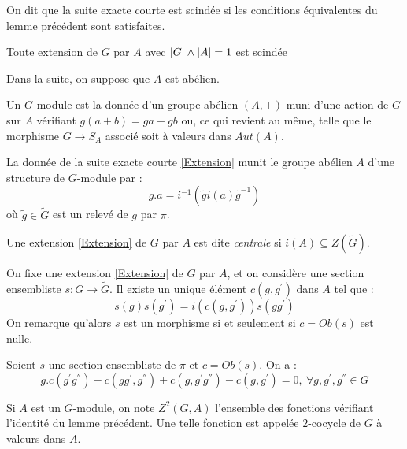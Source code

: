 \documentclass{cours}
\begin{document}
\begin{definition}
    On dit que la suite exacte courte est scindée si les conditions équivalentes du lemme précédent sont satisfaites. 
\end{definition}

\begin{theorem}
    Toute extension de $G$ par $A$ avec $\left|G\right| \wedge \left|A\right| = 1$ est scindée
\end{theorem}

Dans la suite, on suppose que $A$ est abélien.

\begin{definition}
    Un $G$-module est la donnée d'un groupe abélien $(A, +)$ muni d'une action de $G$ sur $A$ vérifiant $g(a + b) = ga + gb$ ou, ce qui revient au même, telle que le morphisme $G \rightarrow S_{A}$ associé soit à valeurs dans $Aut(A)$.
\end{definition}

\begin{proposition}
    La donnée de la suite exacte courte \ref{Extension} munit le groupe abélien $A$ d'une structure de $G$-module par : 
    \[
        g.a = i^{-1}\left(\tilde{g}i(a)\tilde{g}^{-1}\right)    
    \]
    où $\tilde{g} \in \tilde{G}$ est un relevé de $g$ par $\pi$.
\end{proposition}

\begin{example}
    Une extension \ref{Extension} de $G$ par $A$ est dite \emph{centrale} si $i(A) \subseteq Z(\tilde{G})$.  
\end{example}

On fixe une extension \ref{Extension} de $G$ par $A$, et on considère une section ensembliste $s : G \rightarrow \tilde{G}$. Il existe un unique élément $c(g, g^{'})$ dans $A$ tel que : 
\[
    s(g)s(g^{'}) = i(c(g, g^{'}))s(gg^{'})
\]
On remarque qu'alors $s$ est un morphisme si et seulement si $c = Ob(s)$ est nulle.

\begin{lemma}
    Soient $s$ une section ensembliste de $\pi$ et $c = Ob(s)$. On a : 
    \[
        g.c(g^{'}g^{''}) - c(gg^{'}, g^{''}) + c(g, g^{'}g^{''}) - c(g, g^{'}) = 0, \ \forall g, g^{'}, g^{''} \in G
    \]
\end{lemma}

\begin{definition}
    Si $A$ est un $G$-module, on note $Z^{2}(G, A)$ l'ensemble des fonctions vérifiant l'identité du lemme précédent. Une telle fonction est appelée $2$-cocycle de $G$ à valeurs dans $A$.
\end{definition}
\end{document}
